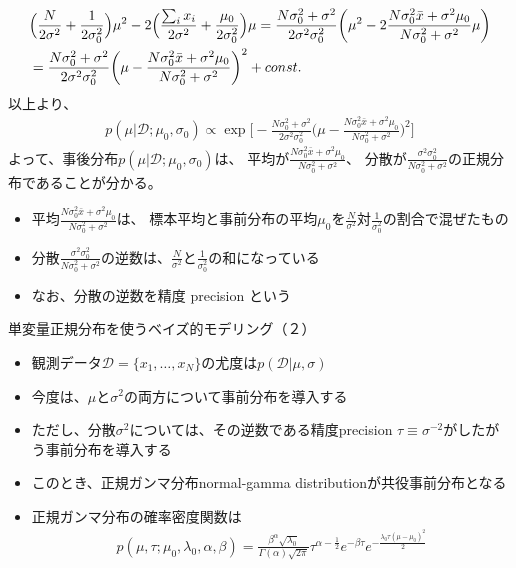 \documentclass[aspectratio=169,unicode,dvipdfmx,14pt]{beamer}
\begin{document}
\begin{frame}
\FontMath
\begin{align}
& \Big( \frac{N}{2\sigma^2} + \frac{1}{2\sigma_0^2} \Big) \mu^2 
- 2 \Big( \frac{ \sum_i x_i}{2\sigma^2} + \frac{\mu_0}{2\sigma_0^2} \Big) \mu 
=
\frac{N\sigma_0^2 + \sigma^2}{2\sigma^2\sigma_0^2} \bigg(
\mu^2 
-  2\frac{ N \sigma_0^2 \bar{x}  + \sigma^2 \mu_0 }{ N\sigma_0^2 + \sigma^2 } \mu \bigg)
\notag \\ & =
\frac{N\sigma_0^2 + \sigma^2}{2\sigma^2\sigma_0^2}
\bigg( \mu - \frac{ N \sigma_0^2 \bar{x}  + \sigma^2 \mu_0 }{ N\sigma_0^2 + \sigma^2 } \bigg)^2
+ const.
\end{align}
以上より、
\begin{align}
p(\mu | \mathcal{D}; \mu_0, \sigma_0)
\propto \exp\bigg[
- \frac{N\sigma_0^2 + \sigma^2}{2\sigma^2\sigma_0^2}
\bigg( \mu - \frac{ N \sigma_0^2 \bar{x}  + \sigma^2 \mu_0 }{ N\sigma_0^2 + \sigma^2 } \bigg)^2
\bigg]
\end{align}
よって、事後分布$p(\mu | \mathcal{D}; \mu_0, \sigma_0)$は、
平均が$\frac{ N \sigma_0^2 \bar{x}  + \sigma^2 \mu_0 }{ N\sigma_0^2 + \sigma^2 }$、
分散が$\frac{\sigma^2\sigma_0^2}{N\sigma_0^2 + \sigma^2}$の正規分布であることが分かる。
\begin{itemize}
\item 平均$\frac{ N \sigma_0^2 \bar{x}  + \sigma^2 \mu_0 }{ N\sigma_0^2 + \sigma^2 }$は、
標本平均と事前分布の平均$\mu_0$を$\frac{N}{\sigma^2}$対$\frac{1}{\sigma_0^2}$の割合で混ぜたもの
\item 分散$\frac{\sigma^2\sigma_0^2}{N\sigma_0^2 + \sigma^2}$の逆数は、$\frac{N}{\sigma^2}$と$\frac{1}{\sigma_0^2}$の和になっている
\item なお、分散の逆数を精度 precision という
\end{itemize}
\end{frame}

\begin{frame}{単変量正規分布を使うベイズ的モデリング（２）}
\begin{itemize}
\item 観測データ$\mathcal{D}=\{x_1,\ldots,x_N\}$の尤度は$p(\mathcal{D}|\mu,\sigma)$
\item 今度は、$\mu$と$\sigma^2$の両方について事前分布を導入する
\item ただし、分散$\sigma^2$については、その逆数である精度precision $\tau \equiv \sigma^{-2}$がしたがう事前分布を導入する
\item このとき、正規ガンマ分布normal-gamma distributionが共役事前分布となる
\item 正規ガンマ分布の確率密度関数は
\begin{align}
p(\mu, \tau ; \mu_0, \lambda_0, \alpha, \beta)
= \frac{\beta^\alpha\sqrt{\lambda_0}}{\Gamma(\alpha)\sqrt{2\pi}}
\tau^{\alpha-\frac{1}{2}}e^{-\beta\tau}e^{-\frac{\lambda_0\tau(\mu - \mu_0)^2}{2}}
\end{align}
\end{itemize}
\end{frame}
\end{document}
